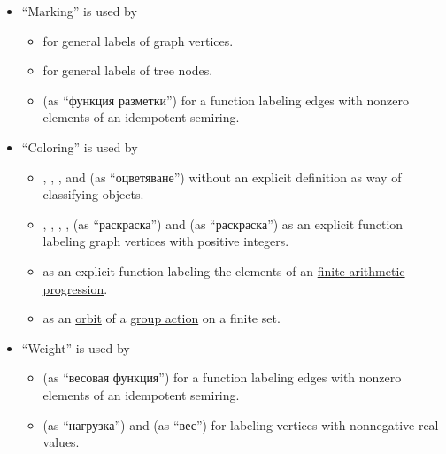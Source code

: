 \begin{remark}
\begin{itemize}
    \item \enquote{Marking} is used by
    \begin{itemize}
      \item {} for general labels of graph vertices.

      \item {} for general labels of tree nodes.

      \item {} (as \enquote{функция разметки}) for a function labeling edges with nonzero elements of an idempotent semiring.
    \end{itemize}

    \item \enquote{Coloring} is used by
    \begin{itemize}
      \item {}, , ,  and  (as \enquote{оцветяване}) without an explicit definition as way of classifying objects.

      \item {}, , , ,  (as \enquote{раскраска}) and  (as \enquote{раскраска}) as an explicit function labeling graph vertices with positive integers.

      \item {} as an explicit function labeling the elements of an \hyperref[def:arithmetic_progression]{finite arithmetic progression}.

      \item {} as an \hyperref[def:group_action_orbit]{orbit} of a \hyperref[def:group_action]{group action} on a finite set.
    \end{itemize}

    \item \enquote{Weight} is used by
    \begin{itemize}
      \item {} (as \enquote{весовая функция}) for a function labeling edges with nonzero elements of an idempotent semiring.

      \item {} (as \enquote{нагрузка}) and  (as \enquote{вес}) for labeling vertices with nonnegative real values.


\end{itemize}
\end{itemize}
\end{remark}
